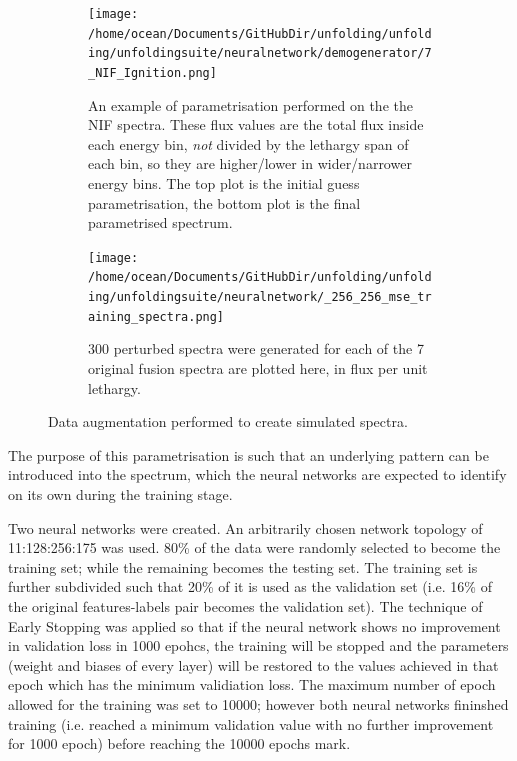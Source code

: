 \documentclass[a4paper, 12pt]{article}
\begin{document}
\begin{figure}
\centering
    \begin{subfigure}[b]{.4\linewidth}
        \texttt{[image: /home/ocean/Documents/GitHubDir/unfolding/unfolding/unfoldingsuite/neuralnetwork/demogenerator/7\_NIF\_Ignition.png]}
        \caption{An example of parametrisation performed on the the NIF spectra. These flux values are the total flux inside each energy bin, \emph{not} divided by the lethargy span of each bin, so they are higher/lower in wider/narrower energy bins. The top plot is the initial guess parametrisation, the bottom plot is the final parametrised spectrum.}\label{Parametrisation}
    \end{subfigure}
    \hfill
    \begin{subfigure}[b]{.55\linewidth}
        \texttt{[image: /home/ocean/Documents/GitHubDir/unfolding/unfolding/unfoldingsuite/neuralnetwork/\_256\_256\_mse\_training\_spectra.png]}
        \caption{300 perturbed spectra were generated for each of the 7 original fusion spectra are plotted here, in flux per unit lethargy.}\label{SimulatedCollection}
    \end{subfigure}
\caption{Data augmentation performed to create simulated spectra.}
\end{figure}

The purpose of this parametrisation is such that an underlying pattern can be introduced into the spectrum, which the neural networks are expected to identify on its own during the training stage.

Two neural networks were created. An arbitrarily chosen network topology of 11:128:256:175 was used. 80\% of the data were randomly selected to become the training set; while the remaining becomes the testing set. The training set is further subdivided such that 20\% of it is used as the validation set (i.e. 16\% of the original features-labels pair becomes the validation set). The technique of Early Stopping was applied so that if the neural network shows no improvement in validation loss in 1000 epohcs, the training will be stopped and the parameters (weight and biases of every layer) will be restored to the values achieved in that epoch which has the minimum validiation loss. The maximum number of epoch allowed for the training was set to 10000; however both neural networks fininshed training (i.e. reached a minimum validation value with no further improvement for 1000 epoch) before reaching the 10000 epochs mark.
\end{document}
